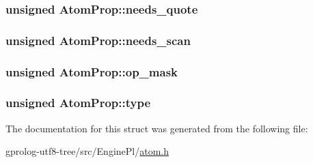 \subsubsection[{\texorpdfstring{needs\+\_\+quote}{needs_quote}}]{\setlength{\rightskip}{0pt plus 5cm}unsigned Atom\+Prop\+::needs\+\_\+quote}\hypertarget{structAtomProp_a4b3fe8dfeb73dc67be63684028709774}{}\label{structAtomProp_a4b3fe8dfeb73dc67be63684028709774}
\subsubsection[{\texorpdfstring{needs\+\_\+scan}{needs_scan}}]{\setlength{\rightskip}{0pt plus 5cm}unsigned Atom\+Prop\+::needs\+\_\+scan}\hypertarget{structAtomProp_ada3d42fc8a9d6e708de7db347444b6ee}{}\label{structAtomProp_ada3d42fc8a9d6e708de7db347444b6ee}
\subsubsection[{\texorpdfstring{op\+\_\+mask}{op_mask}}]{\setlength{\rightskip}{0pt plus 5cm}unsigned Atom\+Prop\+::op\+\_\+mask}\hypertarget{structAtomProp_add308662f264e390f71e5557b97837c0}{}\label{structAtomProp_add308662f264e390f71e5557b97837c0}
\subsubsection[{\texorpdfstring{type}{type}}]{\setlength{\rightskip}{0pt plus 5cm}unsigned Atom\+Prop\+::type}\hypertarget{structAtomProp_accd017afa6f2854bb9316f492449c025}{}\label{structAtomProp_accd017afa6f2854bb9316f492449c025}


The documentation for this struct was generated from the following file\+:\begin{DoxyCompactItemize}
\item 
gprolog-\/utf8-\/tree/src/\+Engine\+Pl/\hyperlink{atom_8h}{atom.\+h}\end{DoxyCompactItemize}
